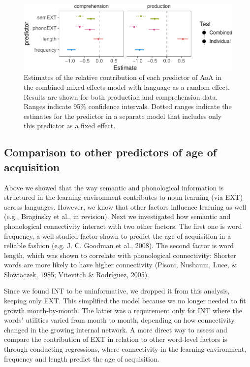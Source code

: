 \documentclass[english,floatsintext,man]{apa6}
\theoremstyle{definition}
\theoremstyle{definition}
\theoremstyle{definition}
\theoremstyle{remark}
\begin{document}
\begin{figure}[!h]
\includegraphics[width=\textwidth]{ms_files/figure-latex/staticAll-1} \caption{Estimates of the relative contribution of each predictor of AoA in the combined mixed-effects model with language as a random effect. Results are shown for both production and comprehension data. Ranges indicate 95\% confidence intervals. Dotted ranges indicate the estimates for the predictor in a separate model that includes only this predictor as a fixed effect.}\label{fig:staticAll}
\end{figure}

\subsection{Comparison to other predictors of age of
acquisition}\label{comparison-to-other-predictors-of-age-of-acquisition}

Above we showed that the way semantic and phonological information is
structured in the learning environment contributes to noun learning (via
EXT) across languages. However, we know that other factors influence
learning as well (e.g., Braginsky et al., in revision). Next we
investigated how semantic and phonological connectivity interact with
two other factors. The first one is word frequency, a well studied
factor shown to predict the age of acquisition in a reliable fashion
(e.g. J. C. Goodman et al., 2008). The second factor is word length,
which was shown to correlate with phonological connectivity: Shorter
words are more likely to have higher connectivity (Pisoni, Nusbaum,
Luce, \& Slowiaczek, 1985; Vitevitch \& Rodríguez, 2005).

Since we found INT to be uninformative, we dropped it from this
analysis, keeping only EXT. This simplified the model because we no
longer needed to fit growth month-by-month. The latter was a requirement
only for INT where the words' utilities varied from month to month,
depending on how connectivity changed in the growing internal network. A
more direct way to assess and compare the contribution of EXT in
relation to other word-level factors is through conducting regressions,
where connectivity in the learning environment, frequency and length
predict the age of acquisition.
\end{document}
